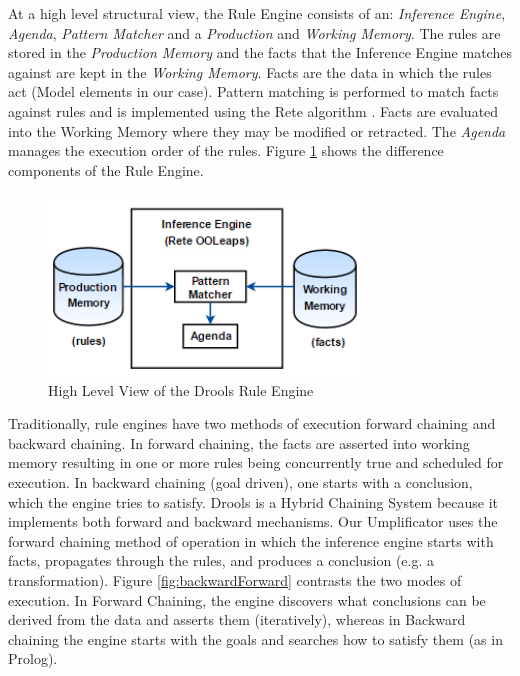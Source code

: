 At a high level structural view, the Rule Engine consists of an: \textit{Inference Engine}, \textit{Agenda}, \textit{Pattern Matcher} and a \textit{Production} and \textit{Working Memory}. 
The rules are stored in the \textit{Production Memory} and the facts that the Inference Engine matches against are kept in the \textit{Working Memory}.
Facts are the data in which the rules act (Model elements in our case).
Pattern matching is performed to match facts against rules and is implemented using the Rete algorithm \cite{reteDROOLS}. Facts are evaluated into the Working Memory where they may be modified or retracted. The \textit{Agenda} manages the execution order of the rules. Figure \ref{fig:RuleEngineArchitecture} shows the difference components of the Rule Engine.

\begin{figure}[h]
\centering
\includegraphics[width=0.75\textwidth]{Figures/RuleEngineArchitecture.png}
\caption{High Level View of the Drools Rule Engine}
\label{fig:RuleEngineArchitecture}
\end{figure}

Traditionally, rule engines have two methods of execution \cite{RulebasedSystems} forward chaining and backward chaining. In forward chaining, the facts are asserted into working memory resulting in one or more rules being concurrently true and scheduled for execution. In backward chaining (goal driven), one starts with a conclusion, which the engine tries to satisfy. Drools is a Hybrid Chaining System because it implements both forward and backward mechanisms. Our Umplificator uses the forward chaining method of operation in which the inference engine starts with facts, propagates through the rules, and produces a conclusion (e.g. a transformation). Figure \ref{fig:backwardForward} contrasts the two modes of execution. In Forward Chaining, the engine discovers what conclusions can be derived from the data and asserts them (iteratively), whereas in Backward chaining the engine starts with the goals and searches how to satisfy them (as in Prolog).



